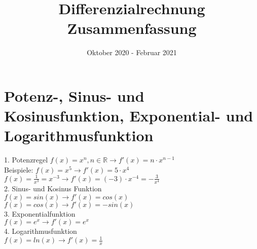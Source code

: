 \documentclass[a4paper]{article}
\title{Differenzialrechnung Zusammenfassung}
\date{Oktober 2020 - Februar 2021}
\begin{document}
\maketitle
\tableofcontents

\section{Potenz-, Sinus- und Kosinusfunktion, Exponential- und Logarithmusfunktion}
1. Potenzregel 
$ f(x) = x^n, n \in \mathds{R} \longrightarrow f'(x) = n \cdot x^{n-1} $\\
Beispiele: 
$f(x) = x^5 \longrightarrow f'(x) = 5 \cdot x^4$ \\
$f(x) = \frac{1}{x^{3}} = x^{-3} \longrightarrow f'(x) = (-3) \cdot x^{-4} = -\frac{3}{x^{4}} $ \\
2. Sinus- und Kosinus Funktion \\
$f(x) = sin(x) \longrightarrow f'(x) = cos(x) $ \\
$f(x) = cos(x) \longrightarrow f'(x) = -sin(x) $ \\
3. Exponentialfunktion \\
$f(x) = e^x \longrightarrow f'(x)=e^x$ \\
4. Logarithmusfunktion \\
$ f(x) = ln(x) \longrightarrow f'(x) = \frac{1}{x}$
\end{document}
